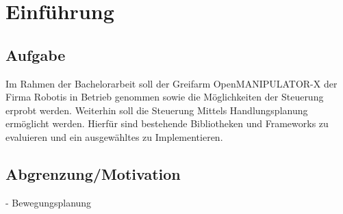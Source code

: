 \chapter{Einführung}
\section{Aufgabe}
Im Rahmen der Bachelorarbeit soll der Greifarm OpenMANIPULATOR-X der Firma Robotis in Betrieb genommen sowie die Möglichkeiten der Steuerung erprobt werden. Weiterhin soll die Steuerung Mittels Handlungsplanung ermöglicht werden. Hierfür sind bestehende Bibliotheken und Frameworks zu evaluieren und ein ausgewähltes zu Implementieren. 
\section{Abgrenzung/Motivation}
- Bewegungsplanung
